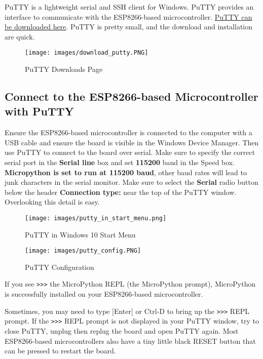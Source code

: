 \documentclass{book}
\makeatletter
\def\maxwidth{\ifdim\Gin@nat@width>\linewidth\linewidth
\else\Gin@nat@width\fi}
\let\Oldincludegraphics\includegraphics
\renewcommand{\includegraphics}[1]{\Oldincludegraphics[width=.8\maxwidth]{#1}}
\newcommand{\passthrough}[1]{#1}
\makeatother
\begin{document}
PuTTY is a lightweight serial and SSH client for Windows. PuTTY provides
an interface to communicate with the ESP8266-based microcontroller.
\href{https://www.putty.org/}{PuTTY can be downloaded here}. PuTTY is
pretty small, and the download and installation are quick.

\begin{figure}
\centering
\texttt{[image: images/download\_putty.PNG]}
\caption{PuTTY Downloads Page}
\end{figure}
    




    
        \hypertarget{connect-to-the-esp8266-based-microcontroller-with-putty}{%
\subsection{Connect to the ESP8266-based Microcontroller with
PuTTY}\label{connect-to-the-esp8266-based-microcontroller-with-putty}}
    




    
        Ensure the ESP8266-based microcontroller is connected to the computer
with a USB cable and ensure the board is visible in the Windows Device
Manager. Then use PuTTY to connect to the board over serial. Make sure
to specify the correct serial port in the \textbf{Serial line} box and
set \textbf{115200} baud in the Speed box. \textbf{Micropython is set to
run at 115200 baud}, other baud rates will lead to junk characters in
the serial monitor. Make sure to select the \textbf{Serial} radio button
below the header \textbf{Connection type:} near the top of the PuTTY
window. Overlooking this detail is easy.

\begin{figure}
\centering
\texttt{[image: images/putty\_in\_start\_menu.png]}
\caption{PuTTY in Windows 10 Start Menu}
\end{figure}

\begin{figure}
\centering
\texttt{[image: images/putty\_config.PNG]}
\caption{PuTTY Configuration}
\end{figure}

If you see \passthrough{\lstinline!>>>!} the MicroPython REPL (the
MicroPython prompt), MicroPython is successfully installed on your
ESP8266-based microcontroller.

Sometimes, you may need to type {[}Enter{]} or Ctrl-D to bring up the
\passthrough{\lstinline!>>>!} REPL prompt. If the
\passthrough{\lstinline!>>>!} REPL prompt is not displayed in your PuTTY
window, try to close PuTTY, unplug then replug the board and open PuTTY
again. Most ESP8266-based microcontrollers also have a tiny little black
RESET button that can be pressed to restart the board.
\end{document}
